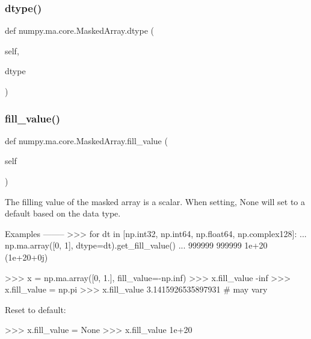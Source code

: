 \subsubsection{\texorpdfstring{dtype()}{dtype()}\hspace{0.1cm}{\footnotesize\ttfamily [2/2]}}
{\footnotesize\ttfamily def numpy.\+ma.\+core.\+Masked\+Array.\+dtype (\begin{DoxyParamCaption}\item[{}]{self,  }\item[{}]{dtype }\end{DoxyParamCaption})}

\mbox{\label{classnumpy_1_1ma_1_1core_1_1MaskedArray_ace3dd24102be9ee3c0fab87dab2f0e36}} 
\subsubsection{\texorpdfstring{fill\+\_\+value()}{fill\_value()}\hspace{0.1cm}{\footnotesize\ttfamily [1/2]}}
{\footnotesize\ttfamily def numpy.\+ma.\+core.\+Masked\+Array.\+fill\+\_\+value (\begin{DoxyParamCaption}\item[{}]{self }\end{DoxyParamCaption})}

\begin{DoxyVerb}The filling value of the masked array is a scalar. When setting, None
will set to a default based on the data type.

Examples
--------
>>> for dt in [np.int32, np.int64, np.float64, np.complex128]:
...     np.ma.array([0, 1], dtype=dt).get_fill_value()
...
999999
999999
1e+20
(1e+20+0j)

>>> x = np.ma.array([0, 1.], fill_value=-np.inf)
>>> x.fill_value
-inf
>>> x.fill_value = np.pi
>>> x.fill_value
3.1415926535897931 # may vary

Reset to default:

>>> x.fill_value = None
>>> x.fill_value
1e+20\end{DoxyVerb}
 \mbox{\label{classnumpy_1_1ma_1_1core_1_1MaskedArray_a17e4b5d6910eba285cc0f3af1eab142a}} 
